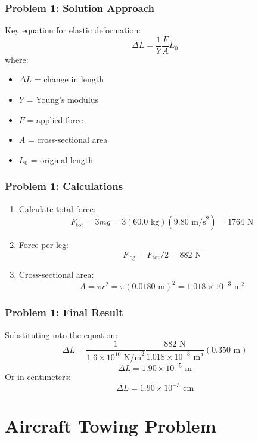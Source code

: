 \documentclass{beamer}
\begin{document}
\begin{frame}
\frametitle{Problem 1: Solution Approach}
Key equation for elastic deformation:
$$\Delta L = \frac{1}{Y} \frac{F}{A} L_0$$
where:
\begin{itemize}
    \item $\Delta L$ = change in length
    \item $Y$ = Young's modulus
    \item $F$ = applied force
    \item $A$ = cross-sectional area
    \item $L_0$ = original length
\end{itemize}
\end{frame}

\begin{frame}
\frametitle{Problem 1: Calculations}
\begin{enumerate}
    \item Calculate total force:
    $$F_{\text{tot}} = 3mg = 3(60.0\text{ kg})(9.80\text{ m/s}^2) = 1764\text{ N}$$
    \item Force per leg:
    $$F_{\text{leg}} = F_{\text{tot}}/2 = 882\text{ N}$$
    \item Cross-sectional area:
    $$A = \pi r^2 = \pi(0.0180\text{ m})^2 = 1.018 \times 10^{-3}\text{ m}^2$$
\end{enumerate}
\end{frame}

\begin{frame}
\frametitle{Problem 1: Final Result}
Substituting into the equation:
$$\Delta L = \frac{1}{1.6 \times 10^{10}\text{ N/m}^2} \frac{882\text{ N}}{1.018 \times 10^{-3}\text{ m}^2}(0.350\text{ m})$$
$$\Delta L = 1.90 \times 10^{-5}\text{ m}$$
Or in centimeters:
$$\Delta L = 1.90 \times 10^{-3}\text{ cm}$$
\end{frame}

\section{Aircraft Towing Problem}
\end{document}
